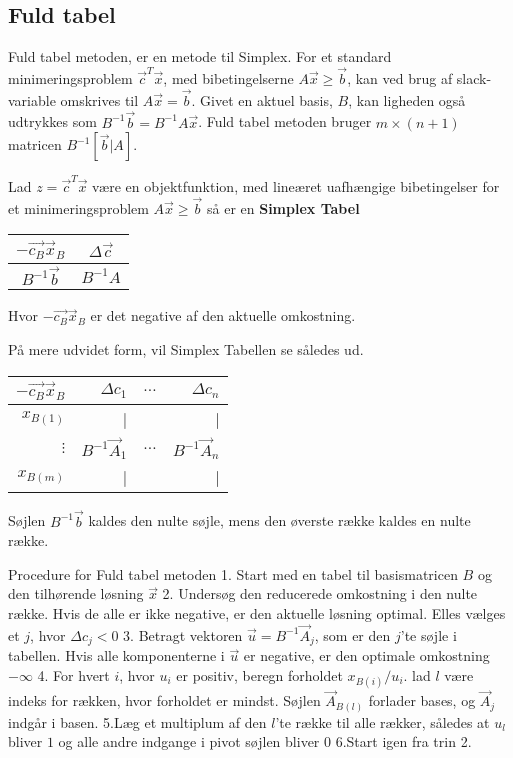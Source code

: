 \subsection{Fuld tabel}
Fuld tabel metoden, er en metode til Simplex. For et standard minimeringsproblem $\vec{c}^T\vec{x}$, med bibetingelserne $A\vec{x} \geq \vec{b}$, kan ved brug af slack-variable omskrives til $A\vec{x}=\vec{b}$. Givet en aktuel basis, $B$, kan ligheden også udtrykkes som  $B^{-1}\vec{b}=B^{-1}A\vec{x}$. Fuld tabel metoden bruger $m \times (n+1)$ matricen $B^{-1}[\vec{b}|A]$.\\

\begin{defn}
Lad $z=\vec{c}^T\vec{x}$ være en objektfunktion, med lineæret uafhængige bibetingelser for et minimeringsproblem $A\vec{x} \geq \vec{b}$ så er en \textbf{Simplex Tabel}\\
\begin{center}
\begin{tabular}{| c | c |}
  \hline
  $-\vec{c_B}\vec{x}_B$&$\Delta\vec{c}$ \\ \hline			
  $B^{-1}\vec{b}$ & $B^{-1}A$ \\ \hline
\end{tabular}
\end{center}
Hvor $-\vec{c_B}\vec{x}_B$ er det negative af den aktuelle omkostning. 
\end{defn}


På mere udvidet form, vil Simplex Tabellen se således ud.
\begin{center}
\begin{tabular}{| r|r r r|}
  \hline	
  $-\vec{c_B}\vec{x}_B$&$\Delta c_1 $ & $\dots$ &$\Delta c_n$\\ \hline	
  $x_{B(1)}$ &	| & & |\\	
  $\vdots$  & $B^{-1}\vec{A}_1$ & $\hdots$ & $B^{-1}\vec{A}_n$\\
   $x_{B(m)}$ &	| & & |\\
   \hline
\end{tabular}
\end{center}
Søjlen $B^{-1}\vec{b}$ kaldes den nulte søjle, mens den øverste række kaldes en nulte række.

\begin{pro} [label=pro:simplex,numbers=none,xleftmargin=0em] {Procedure for Fuld tabel metoden}
1. Start med en tabel til basismatricen $B$ og den tilhørende løsning $\vec{x}$
2. Undersøg den reducerede omkostning i den nulte række. Hvis de alle er ikke negative, er den aktuelle løsning optimal. Elles vælges et $j$, hvor $\Delta c_j <0$
3. Betragt vektoren $\vec{u}=B^{-1}\vec{A}_j$, som er den $j$'te søjle i tabellen. Hvis alle komponenterne i $\vec{u}$ er negative, er den optimale omkostning $-\infty$
4. For hvert $i$, hvor $u_i$ er positiv, beregn forholdet $x_{B(i)}/u_i$. lad $l$ være indeks for rækken, hvor forholdet er mindst. Søjlen $\vec{A}_{B(l)}$ forlader bases, og $\vec{A}_j$ indgår i basen. 
5.Læg et multiplum af den $l$'te række til alle rækker, således at $u_l$ bliver $1$ og alle andre indgange i pivot søjlen bliver $0$
6.Start igen fra trin 2. 
\end{pro}

